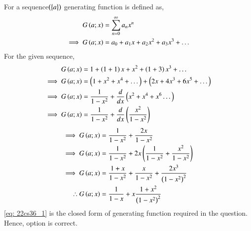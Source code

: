 \documentclass[journal,12pt,twocolumn]{IEEEtran}
\theoremstyle{remark}
\begin{document}
For a sequence$ \left(\bigl\{ a \bigl\}\right)$ generating function is defined as,
\begin{align}
G\left(a;x\right) &= \sum_{n=0}^{\infty} a_n x^n\\
\implies G\left(a;x\right)&=a_0 + a_1 x + a_2 x^2 + a_3 x^3 + \dots
\end{align}
For the given sequence,
\begin{align}
G\left(a;x\right) &= 1 + \left(1+1\right) x + x^2 + \left(1+3\right) x^3 + \dots\\
\implies G\left(a;x\right) &= \left(1+x^2+x^4 + \dots\right) + \left(2x+4x^3 + 6x^5 + \dots\right)\\
\implies G\left(a;x\right) &= \frac{1}{1-x^2} + \frac{d}{dx}\left(x^2+x^4+x^6 \dots\right)\\
\implies G\left(a;x\right) &= \frac{1}{1-x^2} + \frac{d}{dx}\left(\frac{x^2}{1-x^2}\right)
\end{align}
\begin{align}
\implies G\left(a;x\right)&= \frac{1}{1-x^2} + \frac{2x}{1-x^2} \\
\implies G\left(a;x\right)&= \frac{1}{1-x^2} + 2x\left(\frac{1}{1-x^2}+\frac{x^2}{1-x^2}\right)\\
\implies G\left(a;x\right)&= \frac{1+x}{1-x^2} + \frac{x}{1-x^2}+\frac{2x^3}{\left(1-x^2\right)^2}\\
\therefore G\left(a;x\right) &= \frac{1}{1-x} + x\frac{1+x^2}{\left(1-x^2\right)^2}\label{eq: 22cs36_1}
\end{align}
\eqref{eq: 22cs36_1} is the closed form of generating function required in the question.\\
Hence, option  is correct.
\end{document}
